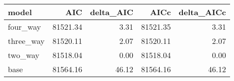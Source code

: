 \begin{table}[ht]
\centering
\begin{tabular}{lrrrr}
  \hline
model & AIC & delta\_AIC & AICc & delta\_AICc \\ 
  \hline
four\_way & 81521.34 & 3.31 & 81521.35 & 3.31 \\ 
  three\_way & 81520.11 & 2.07 & 81520.11 & 2.07 \\ 
  two\_way & 81518.04 & 0.00 & 81518.04 & 0.00 \\ 
  base & 81564.16 & 46.12 & 81564.16 & 46.12 \\ 
   \hline
\end{tabular}
\end{table}
